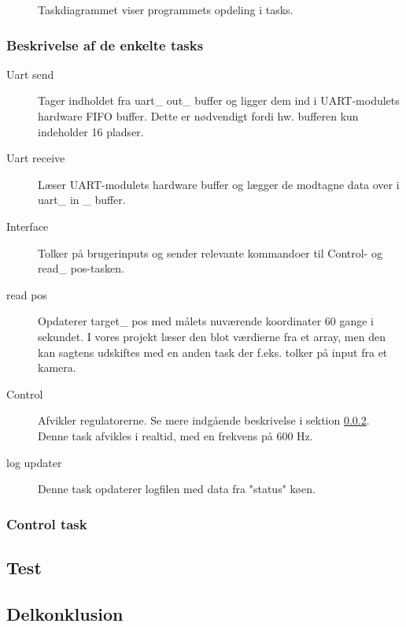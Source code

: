 \begin{figure}[!h]
\centering
\begin{tikzpicture}[node distance = 3.2cm]
	
\end{tikzpicture}
\caption[Task diagram]{Taskdiagrammet viser programmets opdeling i tasks.}
\label{fig:task_diagram}
\end{figure}

\subsubsection{Beskrivelse af de enkelte tasks}
\begin{description}
	\item[Uart send] Tager indholdet fra uart\_ out\_ buffer og ligger dem ind i UART-modulets hardware FIFO buffer. Dette er nødvendigt fordi hw. bufferen kun indeholder 16 pladser. \citep[Side. 430]{lm3s6965}
	\item[Uart receive] Læser UART-modulets hardware buffer og lægger de modtagne data over i uart\_ in \_ buffer. 
	\item[Interface] Tolker på brugerinputs og sender relevante kommandoer til Control- og read\_ pos-tasken.
	\item[read pos] Opdaterer target\_ pos med målets nuværende koordinater 60 gange i sekundet. I vores projekt læser den blot værdierne fra et array, men den kan sagtens udskiftes med en anden task der f.eks. tolker på input fra et kamera.
	\item[Control] Afvikler regulatorerne. Se mere indgående beskrivelse i sektion \ref{sec:control_task}. Denne task afvikles i realtid, med en frekvens på 600 Hz. 
	\item[log updater] Denne task opdaterer logfilen  med data fra "status" køen.
\end{description}




\subsubsection{Control task}
\label{sec:control_task}


\subsection{Test} 
% 





\subsection{Delkonklusion}

